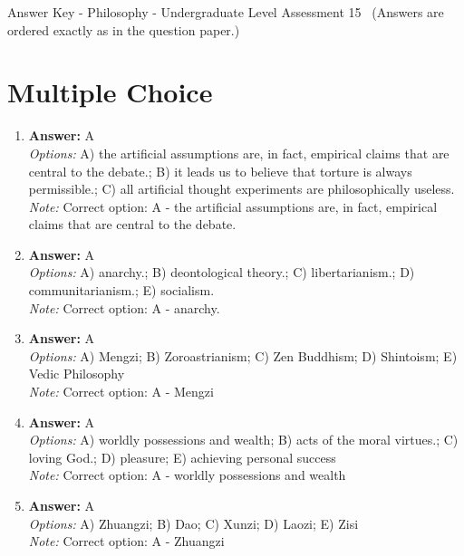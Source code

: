 \documentclass[12pt]{article}
\begin{document}
\begin{center}
Answer Key - Philosophy - Undergraduate Level Assessment 15 \
\small (Answers are ordered exactly as in the question paper.)
\end{center}

\section*{Multiple Choice}
\begin{enumerate}[label=\arabic*.]
\item \textbf{Answer:} A
\\ \textit{Options:} A) the artificial assumptions are, in fact, empirical claims that are central to the debate.; B) it leads us to believe that torture is always permissible.; C) all artificial thought experiments are philosophically useless.
\\ \textit{Note:} Correct option: A - the artificial assumptions are, in fact, empirical claims that are central to the debate.
\item \textbf{Answer:} A
\\ \textit{Options:} A) anarchy.; B) deontological theory.; C) libertarianism.; D) communitarianism.; E) socialism.
\\ \textit{Note:} Correct option: A - anarchy.
\item \textbf{Answer:} A
\\ \textit{Options:} A) Mengzi; B) Zoroastrianism; C) Zen Buddhism; D) Shintoism; E) Vedic Philosophy
\\ \textit{Note:} Correct option: A - Mengzi
\item \textbf{Answer:} A
\\ \textit{Options:} A) worldly possessions and wealth; B) acts of the moral virtues.; C) loving God.; D) pleasure; E) achieving personal success
\\ \textit{Note:} Correct option: A - worldly possessions and wealth
\item \textbf{Answer:} A
\\ \textit{Options:} A) Zhuangzi; B) Dao; C) Xunzi; D) Laozi; E) Zisi
\\ \textit{Note:} Correct option: A - Zhuangzi
\end{enumerate}
\end{document}
